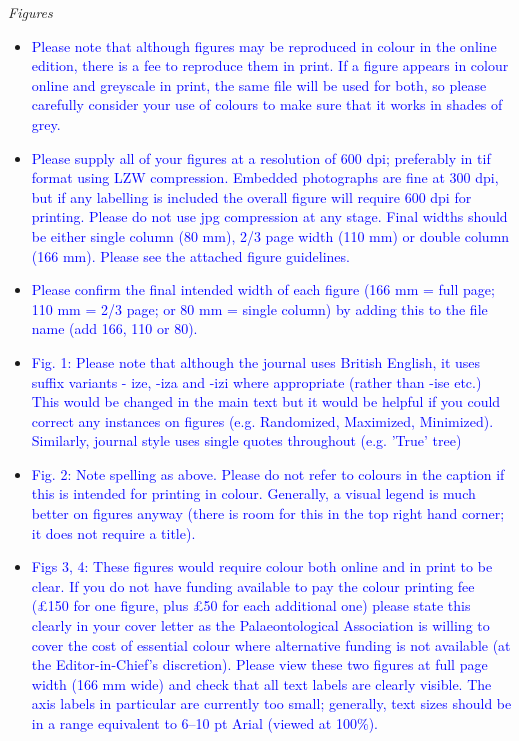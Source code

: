 \documentclass[12pt,letterpaper]{article}
\renewcommand{\subsection}[1]{%
\bigskip
\begin{center}
\begin{large}
\normalfont\itshape #1
\end{large}
\end{center}}
\begin{document}
\subsection{Figures}
\begin{itemize}
\item{\textcolor{blue}{Please note that although figures may be reproduced in colour in the online edition, there is a fee to reproduce them in print. If a figure appears in colour online and greyscale in print, the same file will be used for both, so please carefully consider your use of colours to make sure that it works in shades of grey.}}
\item{\textcolor{blue}{Please supply all of your figures at a resolution of 600 dpi; preferably in tif format using LZW compression. Embedded photographs are fine at 300 dpi, but if any labelling is included the overall figure will require 600 dpi for printing. Please do not use jpg compression at any stage. Final widths should be either single column (80 mm), 2/3 page width (110 mm) or double column (166 mm). Please see the attached figure
guidelines.}}
\item{\textcolor{blue}{Please confirm the final intended width of each figure (166 mm = full page; 110 mm = 2/3 page; or 80 mm = single column) by adding this to the file name (add 166, 110 or 80).}}
\item{\textcolor{blue}{Fig. 1: Please note that although the journal uses British English, it uses suffix variants - ize, -iza and -izi where appropriate (rather than -ise etc.) This would be changed in the main text but it would be helpful if you could correct any instances on figures (e.g. Randomized, Maximized, Minimized). Similarly, journal style uses single quotes throughout (e.g. 'True' tree)}}
\item{\textcolor{blue}{Fig. 2: Note spelling as above. Please do not refer to colours in the caption if this is intended for printing in colour. Generally, a visual legend is much better on figures anyway (there is room for this in the top right hand corner; it does not require a title).}}
\item{\textcolor{blue}{Figs 3, 4: These figures would require colour both online and in print to be clear. If you do not have funding available to pay the colour printing fee (£150 for one figure, plus £50 for each additional one) please state this clearly in your cover letter as the Palaeontological Association is willing to cover the cost of essential colour where alternative funding is not available (at the Editor-in-Chief's discretion). Please view these two figures at full page width (166 mm wide) and check that all text labels are clearly visible. The axis labels in particular are currently too small; generally, text sizes should be in a range equivalent to 6–10 pt Arial (viewed at 100\%).}}
\end{itemize}
\end{document}
